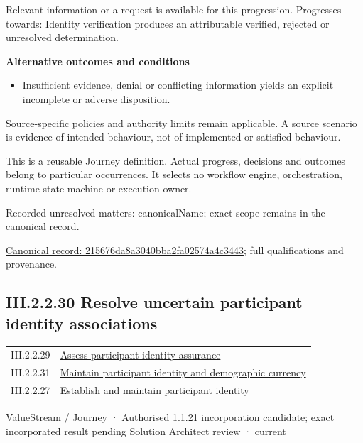 Relevant information or a request is available for this progression. Progresses towards: Identity verification produces an attributable verified, rejected or unresolved determination.



\par\medskip\textbf{Alternative outcomes and conditions}\par


\begin{itemize}


\item Insufficient evidence, denial or conflicting information yields an explicit incomplete or adverse disposition.

\end{itemize}


Source-specific policies and authority limits remain applicable. A source scenario is evidence of intended behaviour, not of implemented or satisfied behaviour.



This is a reusable Journey definition. Actual progress, decisions and outcomes belong to particular occurrences. It selects no workflow engine, orchestration, runtime state machine or execution owner.


{\small Recorded unresolved matters: canonicalName; exact scope remains in the canonical record.}\par
{\footnotesize \href{../../../../../../../continuum/strategy/value-stream/215676da8a3040bba2fa02574a4c3443.md}{Canonical record: 215676da8a3040bba2fa02574a4c3443}; full qualifications and provenance.}\par
\subsection*{III.2.2.30 Resolve uncertain participant identity associations}
\label{navigation:III.2.2.30}

\begin{longtable}{p{.22\linewidth}p{.73\linewidth}}
III.2.2.29 & \hyperref[element:215676da8a3040bba2fa02574a4c3443]{Assess participant identity assurance} \\
III.2.2.31 & \hyperref[element:393b2a5eeda94c36841c2673ca1f391e]{Maintain participant identity and demographic currency} \\
III.2.2.27 & \hyperref[element:f0ce31d5b71c4c5ab37ade566b224808]{Establish and maintain participant identity} \\
\end{longtable}
\label{element:32fcf92667ae46578ab213f879c8a799}
{\small ValueStream / Journey · Authorised 1.1.21 incorporation candidate; exact incorporated result pending Solution Architect review · current}\par

